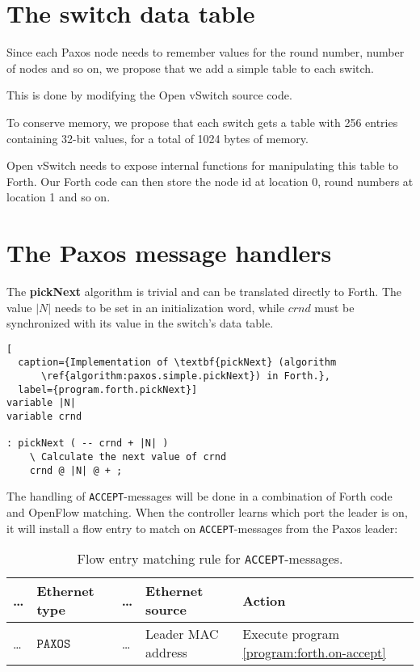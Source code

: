 \section{The switch data table}

Since each Paxos node needs to remember values for the round
number, number
of nodes and so on, we propose that we add a simple table to each switch.

This is done by modifying the Open vSwitch source code.

To conserve memory, we propose that each switch gets a table with 256
entries containing 32-bit values, for a total of 1024 bytes of memory.

Open vSwitch needs to expose internal functions for manipulating this table
to Forth.  Our Forth code can then store the node id at location 0, round
numbers at location 1 and so on.

\section{The Paxos message handlers}

The \textbf{pickNext} algorithm is trivial and can be translated directly to
Forth.  The value $|N|$ needs to be set in an initialization word,
while $crnd$ must be synchronized with its value in the switch's data table.

\begin{lstlisting}[
  caption={Implementation of \textbf{pickNext} (algorithm
      \ref{algorithm:paxos.simple.pickNext}) in Forth.},
  label={program.forth.pickNext}]
variable |N|
variable crnd

: pickNext ( -- crnd + |N| )
    \ Calculate the next value of crnd
    crnd @ |N| @ + ;
\end{lstlisting}

The handling of \texttt{ACCEPT}-messages will be done in a combination of
Forth code and OpenFlow matching.  When the controller learns which port the
leader is on, it will install a flow entry to match on
\texttt{ACCEPT}-messages from the Paxos
leader:

\begin{table}[H]
  \centering
  \begin{tabular}{l|l|l|l|l|}
    \hline
      \dots &
      \textbf{Ethernet type} &
      \dots &
      \textbf{Ethernet source} &
      \textbf{Action}
      \\
    \hline
      \dots &
      $\texttt{PAXOS ACCEPT}$
      & \dots
      & Leader MAC address
      & Execute program \ref{program:forth.on-accept}
      \\
    \hline
  \end{tabular}
  \caption{Flow entry matching rule for \texttt{ACCEPT}-messages.}
  \label{table:matching.simple.accept}
\end{table}

